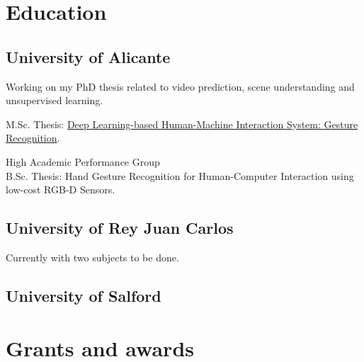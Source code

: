 \documentclass[]{deedy-resume-openfont}
\begin{document}
\begin{minipage}[t]{0.495\textwidth} 


\section{Education} 

\subsection{University of Alicante}
Working on my PhD thesis related to video prediction, scene understanding and unsupervised learning.
\sectionsep

M.Sc. Thesis: \href{http://rua.ua.es/dspace/handle/10045/68353}{ Deep Learning-based Human-Machine Interaction System: Gesture Recognition}.

\sectionsep

High Academic Performance Group \\
B.Sc. Thesis: Hand Gesture Recognition for Human-Computer Interaction using low-cost RGB-D Sensors. 

\sectionsep

\subsection{University of Rey Juan Carlos}
Currently with two subjects to be done. \\

\sectionsep

\subsection{University of Salford}

\sectionsep

\section{Grants and awards}


\end{minipage}
\end{document}
